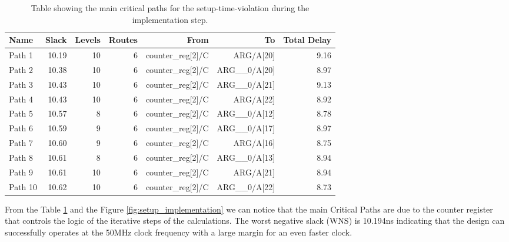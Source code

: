 \begin{table}[H]
    \centering
    \small
    \captionsetup{skip=10pt} 
    \begin{tabular}{lrrrrrr}
        \hline
        Name    & Slack & Levels & Routes  & From           & To               & Total Delay \\
        \hline
        Path 1  & 10.19 &      10 &       6 & counter\_reg[2]/C & ARG/A[20]        & 9.16       \\
        Path 2  & 10.38 &      10 &       6 & counter\_reg[2]/C & ARG\_\_0/A[20]   & 8.97       \\
        Path 3  & 10.43 &      10 &       6 & counter\_reg[2]/C & ARG\_\_0/A[21]   & 9.13       \\
        Path 4  & 10.43 &      10 &       6 & counter\_reg[2]/C & ARG/A[22]        & 8.92       \\
        Path 5  & 10.57 &       8 &       6 & counter\_reg[2]/C & ARG\_\_0/A[12]   & 8.78       \\
        Path 6  & 10.59 &       9 &       6 & counter\_reg[2]/C & ARG\_\_0/A[17]   & 8.97       \\
        Path 7  & 10.60 &       9 &       6 & counter\_reg[2]/C & ARG/A[16]        & 8.75       \\
        Path 8  & 10.61 &       8 &       6 & counter\_reg[2]/C & ARG\_\_0/A[13]   & 8.94       \\
        Path 9  & 10.61 &      10 &       6 & counter\_reg[2]/C & ARG/A[21]        & 8.94       \\
        Path 10 & 10.62 &      10 &       6 & counter\_reg[2]/C & ARG\_\_0/A[22]   & 8.73       \\
        \hline
    \end{tabular}
    \caption{Table showing the main critical paths for the setup-time-violation during the implementation step.}
    \label{tab:setup_implementation}
\end{table}

From the Table \ref{tab:setup_implementation} and the Figure \ref{fig:setup_implementation} we can notice that the main Critical Paths are due to the counter register that controls the logic of the iterative steps of the calculations. The worst negative slack (WNS) is 10.194ns indicating that the design can successfully operates at the 50MHz clock frequency with a large margin for an even faster clock.

